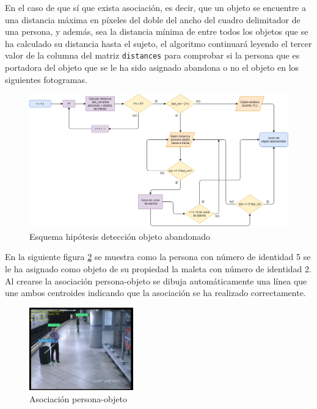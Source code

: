 En el caso de que sí que exista asociación, es decir, que un objeto se encuentre a una distancia máxima en píxeles del doble del ancho del cuadro delimitador de una persona, y además, sea la distancia mínima de entre todos los objetos que se ha calculado su distancia hasta el sujeto, el algoritmo continuará leyendo el tercer valor de la columna del matriz \texttt{distances} para comprobar si la persona que es portadora del objeto que se le ha sido asignado abandona o no el objeto en los siguientes fotogramas.

\begin{figure}[ht]
\centering
\includegraphics[width=1\textwidth]{img/chapters/desarrollo/abandoned-object-scheme.png}
\caption{\label{fig:abandoned-object-scheme}Esquema hipótesis detección objeto abandonado}
\end{figure}

En la siguiente figura \ref{fig:link-persona-objeto} se muestra como la persona con número de identidad 5 se le ha asignado como objeto de su propiedad la maleta con número de identidad 2. Al crearse la asociación persona-objeto se dibuja automáticamente una línea que une ambos centroides indicando que la asociación se ha realizado correctamente.

\begin{figure}[ht]
\centering
\includegraphics[width=0.4\textwidth]{img/chapters/desarrollo/link-persona-objeto.jpg}
\caption{\label{fig:link-persona-objeto}Asociación persona-objeto \cite{AVSSAB2007-dataset}}
\end{figure}

